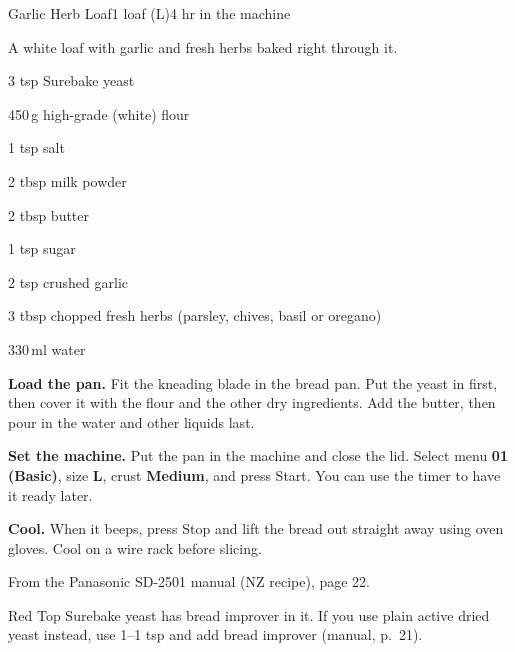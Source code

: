 \begin{recipebox}{Garlic Herb Loaf}{1 loaf (L)}{4 hr in the machine}

A white loaf with garlic and fresh herbs baked right through it.

\begin{ingredients}
  \item 3 tsp Surebake yeast
  \item 450\,g high-grade (white) flour
  \item 1 tsp salt
  \item 2 tbsp milk powder
  \item 2 tbsp butter
  \item 1 tsp sugar
  \item 2 tsp crushed garlic
  \item 3 tbsp chopped fresh herbs (parsley, chives, basil or oregano)
  \item 330\,ml water
\end{ingredients}

\begin{method}
  \item \textbf{Load the pan.} Fit the kneading blade in the bread pan. Put the yeast in first, then cover it with the flour and the other dry ingredients. Add the butter, then pour in the water and other liquids last.
  \item \textbf{Set the machine.} Put the pan in the machine and close the lid. Select menu \textbf{01 (Basic)}, size \textbf{L}, crust \textbf{Medium}, and press Start. You can use the timer to have it ready later.
  \item \textbf{Cool.} When it beeps, press Stop and lift the bread out straight away using oven gloves. Cool on a wire rack before slicing.
\end{method}

\begin{notelist}
  \item From the Panasonic SD-2501 manual (NZ recipe), page 22.
  \item Red Top Surebake yeast has bread improver in it. If you use plain active dried yeast instead, use 1--1 tsp and add bread improver (manual, p.~21).
\end{notelist}

\end{recipebox}
